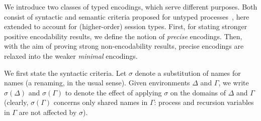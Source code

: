 We introduce two classes of typed encodings, which 
serve different purposes.
Both  consist of syntactic and semantic criteria 
proposed for untyped processes~\cite{Palamidessi03,DBLP:journals/iandc/Gorla10,DBLP:conf/icalp/LanesePSS10},
here extended to account for (higher-order) session types.
First, for stating stronger positive encodability results, 
we define the notion of {\em precise} encodings.
Then, 
with the aim of proving strong non-encodability results, 
precise encodings are relaxed into the weaker {\em minimal} encodings. 

We first state the syntactic criteria. 
Let $\sigma$ denote a substitution of names for names 
(a renaming, in the usual sense). Given environments $\Delta$ and $\Gamma$,
we write $\sigma(\Delta)$ and $\sigma(\Gamma)$ to denote 
the effect of applying $\sigma$ on the 
domains of $\Delta$ and $\Gamma$
(clearly, $\sigma(\Gamma)$ concerns only shared names in $\Gamma$: process and recursion variables in $\Gamma$ are not affected by $\sigma$). 


